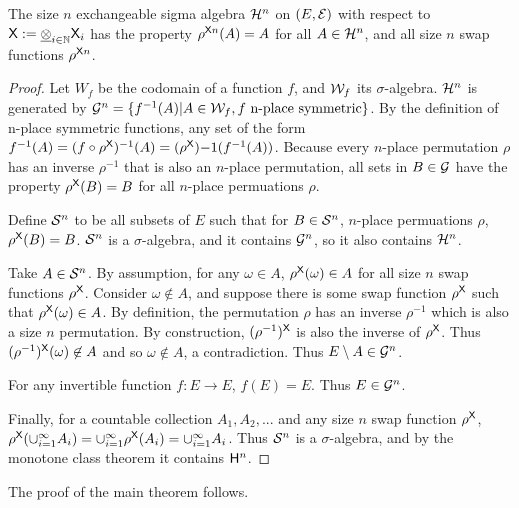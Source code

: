 \begin{lemma}
The size $n$ exchangeable sigma algebra $\mathcal{H}^n$ on $(E,\mathcal{E})$ with respect to $\mathsf{X}:=\underline{\otimes}_{i\in\mathbb{N}}\mathsf{X}_i$ has the property $\rho^{\mathsf{X}n}(A)=A$ for all $A\in \mathcal{H}^n$, and all size $n$ swap functions $\rho^{\mathsf{X}n}$.
\end{lemma}

\begin{proof}
Let $W_f$ be the codomain of a function $f$, and $\mathcal{W}_f$ its $\sigma$-algebra. $\mathcal{H}^n$ is generated by $\mathcal{G}^n=\{f^{-1}(A)|A\in \mathcal{W}_f,f\text{ n-place symmetric}\}$. By the definition of n-place symmetric functions, any set of the form $f^{-1}(A)=(f\circ\rho^{\mathsf{X}})^{-1}(A) = (\rho^{\mathsf{X}}){-1}(f^{-1}(A))$. Because every $n$-place permutation $\rho$ has an inverse $\rho^{-1}$ that is also an $n$-place permutation, all sets in $B\in\mathcal{G}$ have the property $\rho^{\mathsf{X}}(B)=B$ for all $n$-place permuations $\rho$.

Define $\mathcal{S}^n$ to be all subsets of $E$ such that for $B\in \mathcal{S}^n$, $n$-place permuations $\rho$, $\rho^{\mathsf{X}}(B)=B$. $\mathcal{S}^n$ is a $\sigma$-algebra, and it contains $\mathcal{G}^n$, so it also contains $\mathcal{H}^n$.

Take $A\in\mathcal{S}^n$. By assumption, for any $\omega\in A$, $\rho^{\mathsf{X}}(\omega)\in A$ for all size $n$ swap functions $\rho^{\mathsf{X}}$. Consider $\omega\not\in A$, and suppose there is some swap function $\rho^{\mathsf{X}}$ such that $\rho^{\mathsf{X}}(\omega)\in A$. By definition, the permutation $\rho$ has an inverse $\rho^{-1}$ which is also a size $n$ permutation. By construction, $(\rho^{-1})^{\mathsf{X}}$ is also the inverse of $\rho^{\mathsf{X}}$. Thus $(\rho^{-1})^{\mathsf{X}}(\omega)\not\in A$ and so $\omega\not\in A$, a contradiction. Thus $E\setminus A\in \mathcal{G}^n$.

For any invertible function $f:E\to E$, $f(E)=E$. Thus $E\in \mathcal{G}^n$.

Finally, for a countable collection $A_1,A_2,...$ and any size $n$ swap function $\rho^{\mathsf{X}}$, $\rho^{\mathsf{X}}(\cup_{i=1}^{\infty} A_i) = \cup_{i=1}^\infty \rho^{\mathsf{X}}(A_i) = \cup_{i=1}^\infty A_i$. Thus $\mathcal{S}^n$ is a $\sigma$-algebra, and by the monotone class theorem it contains $\mathsf{H}^n$.
\end{proof}

The proof of the main theorem follows.

